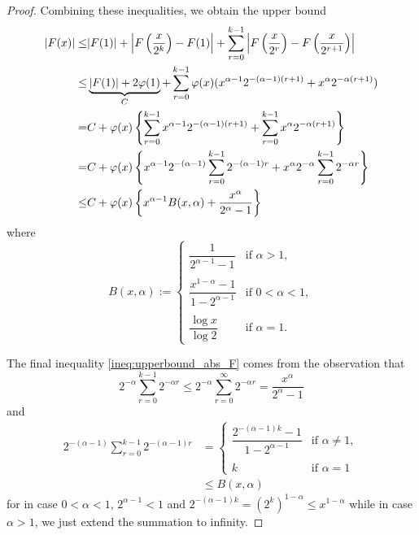 \documentclass[12pt]{article}
\newcommand{\Abs}[1]{\left| #1 \right|}
\begin{document}
\begin{proof}
Combining these inequalities, we obtain the upper bound
\begin{align}
\Abs{ F(x) } \leq& |F(1)| + \Abs{F\left(\frac{x}{2^k}\right) - F(1)} + \sum_{r = 0}^{k-1} \Abs{ F\left(\frac{x}{2^r}\right) - F\left(\frac{x}{2^{r+1}}\right) } \notag\\
\leq & \underbrace{|F(1)| + 2\varphi(1)}_{C} + \sum_{r = 0}^{k-1} \varphi(x) (x^{\alpha - 1} 2^{-(\alpha - 1)(r+1)} + x^{\alpha} {2^{-\alpha (r+1)}}) \notag\\
= & C + \varphi(x) \left\{ \sum_{r = 0}^{k-1} x^{\alpha - 1} 2^{-(\alpha - 1)(r+1)} + \sum_{r = 0}^{k-1} x^{\alpha} {2^{-\alpha (r+1)}} \right\} \notag\\
= & C+ \varphi(x) \left\{ x^{\alpha - 1} 2^{-(\alpha - 1)} \sum_{r = 0}^{k-1} 2^{-(\alpha - 1) r} + x^{\alpha} 2^{-\alpha} \sum_{r = 0}^{k-1} 2^{-\alpha r} \right\} \notag\\
\leq & C + \varphi(x) \left\{ x^{\alpha - 1} B(x, \alpha)
+ \frac{x^{\alpha}}{2^{\alpha} - 1} \right\}
\label{ineq:upperbound_abs_F}
\end{align}
where
$$B(x, \alpha) := \begin{cases}
\dfrac{1}{2^{\alpha - 1} - 1} &\text{if } \alpha > 1,\\\\
\dfrac{x^{1-\alpha} - 1}{1 - 2^{\alpha-1}} &\text{if } 0 < \alpha < 1,\\\\
\dfrac{\log x}{\log 2} &\text{if } \alpha = 1.
\end{cases}$$

The final inequality \eqref{ineq:upperbound_abs_F} comes from the observation that
$$2^{-\alpha} \sum_{r = 0}^{k-1} 2^{-\alpha r} \leq 2^{-\alpha} \sum_{r = 0}^{\infty} 2^{-\alpha r} = \frac{x^{\alpha}}{2^{\alpha} - 1}$$
and
\begin{align*}
2^{-(\alpha - 1)} \sum_{r = 0}^{k-1} 2^{-(\alpha - 1) r} &= \begin{cases}
\dfrac{2^{-(\alpha - 1)k} - 1}{1 - 2^{\alpha-1}} &\text{if }\alpha \not= 1,\\\\
k &\text{if } \alpha = 1
\end{cases}\\
&\leq B(x, \alpha)
\end{align*}
for in case $0 < \alpha < 1$, $2^{\alpha - 1} < 1$ and $2^{-(\alpha - 1)k} = (2^k)^{1-\alpha} \leq x^{1-\alpha}$ while in case $\alpha > 1$, we just extend the summation to infinity.


\end{proof}
\end{document}
